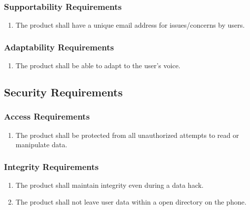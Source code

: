 \documentclass[]{article}
\newcounter{saveenum}
\newcommand{\pauseEnum}{\setcounter{saveenum}{\value{enumi}}}
\newcommand{\resumeEnum}{\setcounter{enumi}{\value{saveenum}}}
\begin{document}
\subsubsection{Supportability Requirements}
\label{ssub:supportability_requirements}
\begin{enumerate}[{MS}1. ]
	\resumeEnum
	\item The product shall have a unique email address for issues/concerns by users.
	\pauseEnum
\end{enumerate}

\subsubsection{Adaptability Requirements}
\label{ssub:adaptability_requirements}
\begin{enumerate}[{MS}1. ]
	\resumeEnum
	\item The product shall be able to adapt to the user's voice.
	\pauseEnum
\end{enumerate}


\subsection{Security Requirements}
\label{sub:security_requirements}

\subsubsection{Access Requirements}
\label{ssub:access_requirements}
\begin{enumerate}[{SR}1. ]
	\item The product shall be protected from all unauthorized attempts to read or manipulate data.
	\pauseEnum
\end{enumerate}

\subsubsection{Integrity Requirements}
\label{ssub:integrity_requirements}
\begin{enumerate}[{SR}1. ]
	\resumeEnum
	\item The product shall maintain integrity even during a data hack.
	\item The product shall not leave user data within a open directory on the phone.
	\pauseEnum
\end{enumerate}
\end{document}
